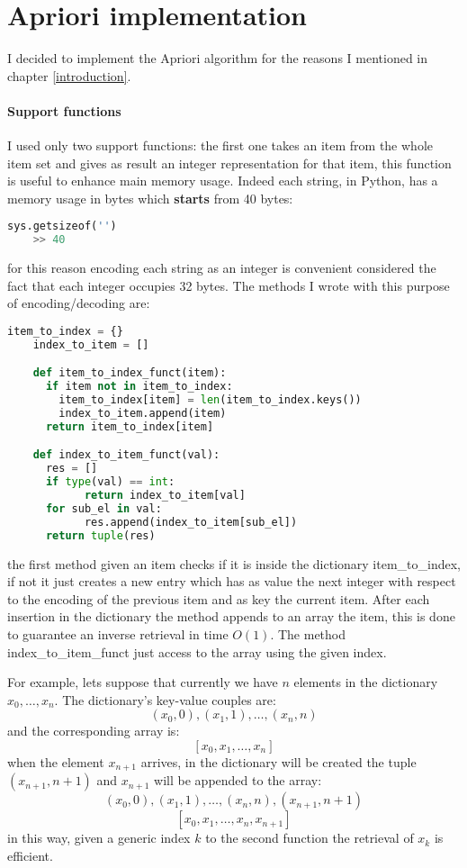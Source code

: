 \section{Apriori implementation}

I decided to implement the Apriori algorithm for the reasons I mentioned in chapter \ref{introduction}. 
\paragraph{Support functions}
I used only two support functions: the first one takes an item from the whole item set and gives as result an integer representation for that item, this function is useful to enhance main memory usage. Indeed each string, in Python, has a memory usage in bytes which \textbf{starts} from 40 bytes:

\begin{lstlisting}[language=Python]
    sys.getsizeof('')
    >> 40
\end{lstlisting}

for this reason encoding each string as an integer is convenient considered the fact that each integer occupies 32 bytes. The methods I wrote with this purpose of encoding/decoding are:

\begin{lstlisting}[language=Python]
    item_to_index = {}
    index_to_item = []

    def item_to_index_funct(item):
      if item not in item_to_index:
        item_to_index[item] = len(item_to_index.keys())
        index_to_item.append(item)
      return item_to_index[item]

    def index_to_item_funct(val):
      res = []
      if type(val) == int:
            return index_to_item[val]
      for sub_el in val:
            res.append(index_to_item[sub_el])
      return tuple(res)
\end{lstlisting}

the first method given an item checks if it is inside the dictionary item\_to\_index, if not it just creates a new entry which has as value the next integer with respect to the encoding of the previous item and as key the current item. After each insertion in the dictionary the method appends to an array the item, this is done to guarantee an inverse retrieval in time $O(1)$. The method index\_to\_item\_funct just access to the array using the given index.

For example, lets suppose that currently we have $n$ elements in the dictionary $x_0, \dots, x_n$. The dictionary's key-value couples are:
$$
(x_0,0),(x_1,1),\dots,(x_n,n)
$$
and the corresponding array is:
$$
[x_0,x_1,\dots,x_n]
$$
when the element $x_{n+1}$ arrives, in the dictionary will be created the tuple $(x_{n+1}, n+1)$ and $x_{n+1}$ will be appended to the array:
$$
(x_0,0),(x_1,1),\dots,(x_n,n),(x_{n+1},n+1)
$$
$$
[x_0,x_1,\dots,x_n,x_{n+1}]
$$
in this way, given a generic index $k$ to the second function the retrieval of $x_k$ is efficient.

